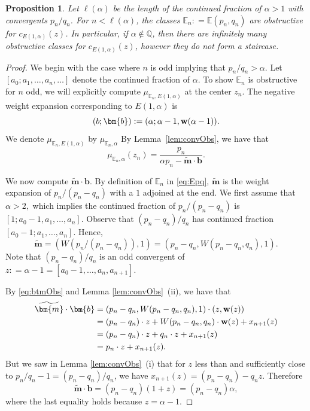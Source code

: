 \documentclass[11pt, reqno]{amsart}
\newtheorem{prop}[thm]{Proposition}
\theoremstyle{remark}
\numberwithin{equation}{subsection}
\numberwithin{figure}{section}
\theoremstyle{customremark}
\newcommand{\bw}{{\bf w}}
\newcommand{\bE}{{\mathbb E}}
\newcommand{\al}{{\alpha}}
\newcommand{\Q}{\mathbb{Q}}
\newcommand{\btm}{\widetilde{\bm{m}}}
\begin{document}
\begin{prop} \label{prop:obs}
    Let $\ell(\al)$ be the length of the continued fraction of $\al>1$ with convergents $p_n/q_n$.     For $n< \ell(\al)$, the classes $\bE_n: = \bE(p_n,q_n)$ are obstructive for $c_{E(1,\al)}(z)$. In particular, if $\al \not\in \Q$, then there are infinitely many obstructive classes for $c_{E(1,\al)}(z)$, however they do not form a staircase.
\end{prop}
\begin{proof}
    We begin with the case where $n$ is odd implying that $p_n/q_n>\al.$
      Let $[a_0;a_1,\hdots,a_n,\hdots]$ denote the continued fraction of $\al$.  To show $\bE_n$ is obstructive for $n$ odd, we will explicitly compute $\mu_{\bE_n,E(1,\al)}$ at the center $z_{n}.$   The negative weight expansion corresponding to $E(1,\al)$ is
    \[ (b;\bm{b}):=(\al;\al-1,\bw(\al-1)).\]
    We denote $\mu_{\bE_n,E(1,\al)}$ by $\mu_{\bE_n,\al}$
    By Lemma~\ref{lem:convObs}, we have that 
    \[ \mu_{\bE_n,\al}(z_{n})=\frac{p_{n}}{\al p_{n}-\btm \cdot \bm{b}}.
    \]
 
    We now compute $\btm \cdot \bm{b}$.  By definition of $\bE_n$ in \eqref{eq:Epq}, $\btm$ is the weight expansion of $p_n/(p_n-q_n)$ with a $1$ adjoined at the end. We first assume that $\al>2,$ which implies the continued fraction of $p_n/(p_n-q_n)$ is $[1;a_0-1,a_1,\hdots,a_{n}]$. Observe that $(p_n-q_n)/q_n$ has continued fraction $[a_0-1;a_1,\hdots,a_n].$ Hence,
  \begin{equation} \label{eq:btmObs}
      \btm=(W(p_n/(p_n-q_n)),1)=(p_n-q_n,W(p_n-q_n,q_n),1).
  \end{equation}
Note that $(p_n-q_n)/q_n$ is an odd convergent of $z: = \al-1=[a_0-1,\hdots,a_n,a_{n+1}].$ 

    
    By \eqref{eq:btmObs} and Lemma \ref{lem:convObs}~(ii), we have that
    \begin{align*} \btm \cdot \bm{b}&=(p_n-q_n,W(p_n-q_n,q_n),1)\cdot(z,\bw(z)) \\
   & = (p_n-q_n)\cdot z+W(p_n-q_n,q_n) \cdot \bw(z) +x_{n+1}(z) \\
           & = (p_n-q_n)\cdot z+q_n\cdot z+x_{n+1}(z) \\
    &=p_n \cdot z+ x_{n+1}(z).
    \end{align*}
But we saw in Lemma \ref{lem:convObs}~(i) that for $z $ less than and sufficiently close to $p_n/q_n-1 = (p_n-q_n)/q_n$, we have
$x_{n+1}(z) = ( p_n-q_n) - q_n z$.  Therefore 
     \begin{equation} \label{eq:obsFinal}
 \btm \cdot \bm{b} = ( p_n-q_n) (1+z) =( p_n-q_n) \al ,
    \end{equation} 
where the last equality holds because $z = \al-1$.


\end{proof}
\end{document}
